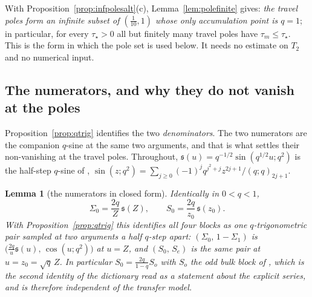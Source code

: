 \documentclass[11pt]{article}
\theoremstyle{plain}
\newtheorem{lemma}[theorem]{Lemma}
\theoremstyle{definition}
\theoremstyle{remark}
\theoremstyle{plain}\newtheorem*{maintheorem}{Main Theorem}
\begin{document}
\noindent With Proposition~\ref{prop:infpolesalt}\textup{(c)}, Lemma~\ref{lem:polefinite} gives:
\emph{the travel poles form an infinite subset of $(\tfrac1{10},1)$ whose only accumulation point
is $q=1$}; in particular, for every $\tau_\star>0$ all but finitely many travel poles have
$\tau_m\le\tau_\star$. This is the form in which the pole set is used below. It needs no estimate
on $T_2$ and no numerical input.

\subsection{The numerators, and why they do not vanish at the poles}\label{sec:numerators}

Proposition~\ref{prop:qtrig} identifies the two \emph{denominators}. The two numerators are the
companion $q$-sine at the same two arguments, and that is what settles their non-vanishing at the
travel poles. Throughout, $\mathfrak s(u)=q^{-1/2}\sin(q^{1/2}u;q^2)$ is the half-step $q$-sine of
{\cite[Lemma ``the gate block in closed form'', \textup{lem:P12closed}]{Bonfioli2026bB}}, $\sin(z;q^2)=\sum_{j\ge0}(-1)^jq^{j^2+j}z^{2j+1}/(q;q)_{2j+1}$.

\begin{lemma}[the numerators in closed form]\label{lem:qsinenum}
Identically in $0<q<1$,
\[
   \Sigma_0=\frac{2q}{Z}\,\mathfrak s(Z),\qquad S_0=\frac{2q}{z_0}\,\mathfrak s(z_0).
\]
With Proposition~\ref{prop:qtrig} this identifies all four blocks as one $q$-trigonometric pair
sampled at two arguments a half $q$-step apart: $(\Sigma_0,\,1-\Sigma_1)$ is
$\bigl(\tfrac{2q}u\mathfrak s(u),\,\cos(u;q^2)\bigr)$ at $u=Z$, and $(S_0,\,S_e)$ is the same pair
at $u=z_0=\sqrt q\,Z$. In particular $S_0=\tfrac{2q}{1-q}S_o$ with $S_o$ the odd bulk block of
{\cite[Lemma ``the gate block in closed form'', \textup{lem:P12closed}]{Bonfioli2026bB}}, which is the second identity of the dictionary {\cite[\textup{(eq:dict)}]{Bonfioli2026bB}} read as a
statement about the explicit series, and is therefore independent of the transfer model.
\end{lemma}
\end{document}
